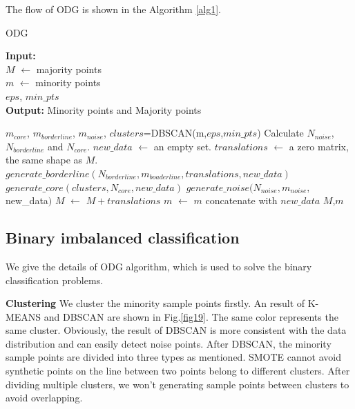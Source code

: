 \documentclass[ida]{iosart2x}
\begin{document}
  The flow of ODG is shown in the Algorithm \ref{alg1}.
  \begin{algorithm}[tbp]
    \caption{ODG} %
    \label{alg1}
    \hspace*{0.02in} {\bf Input:}
     \\$M$ $\leftarrow$ majority points  \\
     $m$ $\leftarrow$ minority points  \\
     $eps$, $min\_pts$\\
    \hspace*{0.02in} {\bf Output:} %
    Minority points and Majority points
    \begin{algorithmic}[1]
    \State $m_{core}$, $m_{borderline}$, $m_{noise}$, $clusters$=DBSCAN(m,$eps$,$min\_pts$) %
    \State Calculate $N_{noise}$, $N_{borderline}$ and $N_{core}$.
    \State $new\_data$ $\leftarrow$ an empty set.
    \State $translations$ $\leftarrow$ a zero matrix, the same shape as $M$.
    \State $generate\_borderline(N_{borderline},m_{boaderline},translations, new\_data)$
    \State $generate\_core(clusters,N_{core},new\_data)$
    \State $generate\_noise(N_{noise},m_{noise},$new\_data$)$
    \State $M$ $\leftarrow$ $M+translations$
    \State $m$ $\leftarrow$ $m$ concatenate with $new\_data$
    \State \Return $M$,$m$
    \end{algorithmic}
    \end{algorithm}

\subsection{Binary imbalanced classification}
We give the details of ODG algorithm, which is used to solve the binary classification problems.

\textbf{Clustering} We cluster the minority sample points firstly.
An result of K-MEANS and DBSCAN are shown in Fig.\ref{fig19}.
The same color represents the same cluster.
Obviously, the result of DBSCAN is more 
consistent with the data distribution and can easily detect noise points.
After DBSCAN, 
the minority sample points are divided into three types as mentioned.
SMOTE cannot avoid synthetic points on the line between 
two points belong to different clusters.
After dividing multiple clusters, 
we won't generating sample points between clusters to avoid overlapping.
\end{document}
